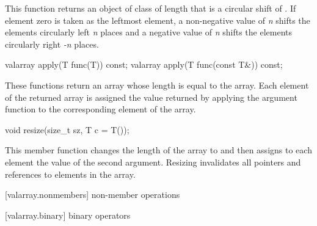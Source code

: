 \begin{itemdescr}
\pnum
This function returns an object of class
of length
that is a circular shift of . If element zero is taken as the leftmost element, a non-negative value of \emph{n} shifts the elements circularly left \emph{n} places and a negative value of \emph{n} shifts the elements circularly right \emph{-n} places.
\end{itemdescr}

%
\begin{itemdecl}
valarray apply(T func(T)) const;
valarray apply(T func(const T&)) const;
\end{itemdecl}

\begin{itemdescr}
\pnum
These functions return an array whose length is equal to the array.
Each element of the returned array is assigned
the value returned by applying the argument function to the
corresponding element of the array.
\end{itemdescr}

%
\begin{itemdecl}
void resize(size_t sz, T c = T());
\end{itemdecl}

\begin{itemdescr}
\pnum
This member function changes the length of the
array to
and then assigns to each element the value of the second argument.
Resizing invalidates all pointers and references to elements in the array.
\end{itemdescr}

[valarray.nonmembers]{ non-member operations}

[valarray.binary]{ binary operators}

